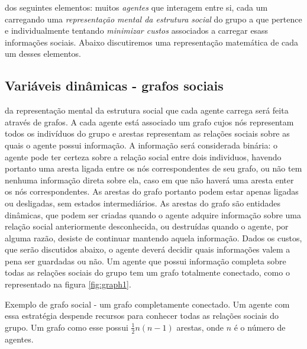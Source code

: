  dos seguintes elementos: muitos \emph{agentes} que interagem entre si, cada um carregando uma \emph{representação mental da estrutura social} do grupo a que pertence e individualmente tentando \emph{minimizar custos} associados a carregar esass informações sociais. Abaixo discutiremos uma representação matemática de cada um desses elementos. 

\subsection{Variáveis dinâmicas - grafos sociais}

 da representação mental da estrutura social que cada agente carrega será feita através de grafos. A cada agente está associado um grafo cujos nós representam todos os indivíduos do grupo e arestas representam as relações sociais sobre as quais o agente possui informação. A informação será considerada binária: o agente pode ter certeza sobre a relação social entre dois individuos, havendo portanto uma aresta ligada entre os nós correspondentes de seu grafo, ou não tem nenhuma informação direta sobre ela, caso em que não haverá uma aresta enter os nós correspondentes. As arestas do grafo portanto podem estar apenas ligadas ou desligadas, sem estados intermediários. As arestas do grafo são entidades dinâmicas, que podem ser criadas quando o agente adquire informação sobre uma relação social anteriormente desconhecida, ou destruídas quando o agente, por alguma razão, desiste de continuar mantendo aquela informação. Dados os custos, que serão discutidos abaixo, o agente deverá decidir quais informações valem a pena ser guardadas ou não. Um agente que possui informação completa sobre todas as relações sociais do grupo tem um grafo totalmente conectado, como o representado na figura \ref{fig:graph1}. 
\begin{marginfigure}[-45em]
 \caption[Grafo totalmente conectado]{Exemplo de grafo social - um grafo completamente conectado. Um agente com essa estratégia despende recursos para conhecer todas as relações sociais do grupo. Um grafo como esse possui $\frac{1}{2} n(n-1)$ arestas, onde $n$ é o número de agentes.}
 \label{fig:graph1}
 \end{marginfigure}
 
